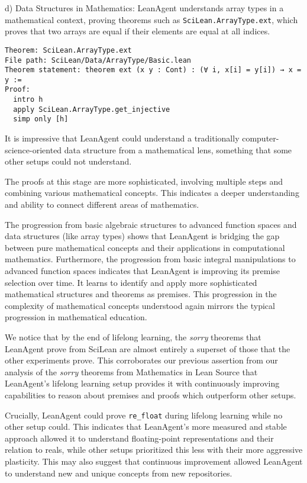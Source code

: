 \documentclass{article} %
\begin{document}
d) Data Structures in Mathematics:
LeanAgent understands array types in a mathematical context, proving theorems such as \texttt{SciLean.ArrayType.ext}, which proves that two arrays are equal if their elements are equal at all indices.

\begin{verbatim}
Theorem: SciLean.ArrayType.ext
File path: SciLean/Data/ArrayType/Basic.lean
Theorem statement: theorem ext (x y : Cont) : (∀ i, x[i] = y[i]) → x = y :=
Proof:
  intro h
  apply SciLean.ArrayType.get_injective
  simp only [h]
\end{verbatim}

It is impressive that LeanAgent could understand a traditionally computer-science-oriented data structure from a mathematical lens, something that some other setups could not understand.

The proofs at this stage are more sophisticated, involving multiple steps and combining various mathematical concepts. This indicates a deeper understanding and ability to connect different areas of mathematics.

The progression from basic algebraic structures to advanced function spaces and data structures (like array types) shows that LeanAgent is bridging the gap between pure mathematical concepts and their applications in computational mathematics. Furthermore, the progression from basic integral manipulations to advanced function spaces indicates that LeanAgent is improving its premise selection over time. It learns to identify and apply more sophisticated mathematical structures and theorems as premises. This progression in the complexity of mathematical concepts understood again mirrors the typical progression in mathematical education.

We notice that by the end of lifelong learning, the \textit{sorry} theorems that LeanAgent prove from SciLean are almost entirely a superset of those that the other experiments prove. This corroborates our previous assertion from our analysis of the \textit{sorry} theorems from Mathematics in Lean Source that LeanAgent's lifelong learning setup provides it with continuously improving capabilities to reason about premises and proofs which outperform other setups.

Crucially, LeanAgent could prove \texttt{re\_float} during lifelong learning while no other setup could. This indicates that LeanAgent's more measured and stable approach allowed it to understand floating-point representations and their relation to reals, while other setups prioritized this less with their more aggressive plasticity. This may also suggest that continuous improvement allowed LeanAgent to understand new and unique concepts from new repositories.
\end{document}
